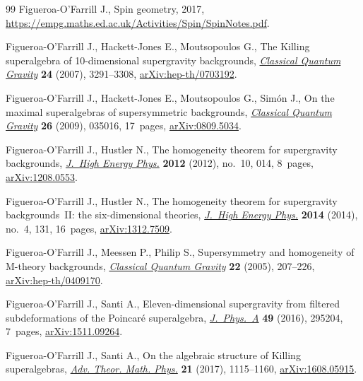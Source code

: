 \documentclass[10pt,a4paper]{amsart}
\numberwithin{equation}{section}
\newcommand{\1}{\mathbbm{1}}
\begin{document}
\begin{thebibliography}{99}
Figueroa-O'Farrill J., Spin geometry, 2017,  \url{https://empg.maths.ed.ac.uk/Activities/Spin/SpinNotes.pdf}.

Figueroa-O'Farrill J., Hackett-Jones E., Moutsopoulos G., The {K}illing
 superalgebra of 10-dimensional supergravity backgrounds,
 \href{https://doi.org/10.1088/0264-9381/24/13/010}{\textit{Classical Quantum
 Gravity}} \textbf{24} (2007), 3291--3308,
 \href{http://arxiv.org/abs/hep-th/0703192}{arXiv:hep-th/0703192}.

Figueroa-O'Farrill J., Hackett-Jones E., Moutsopoulos G., Sim\'on J., On the
 maximal superalgebras of supersymmetric backgrounds,
 \href{https://doi.org/10.1088/0264-9381/26/3/035016}{\textit{Classical
 Quantum Gravity}} \textbf{26} (2009), 035016, 17~pages,
 \href{http://arxiv.org/abs/0809.5034}{arXiv:0809.5034}.

Figueroa-O'Farrill J., Hustler N., The homogeneity theorem for supergravity
 backgrounds, \href{https://doi.org/10.1007/jhep10(2012)014}{\textit{J.~High
 Energy Phys.}} \textbf{2012} (2012), no.~10, 014, 8~pages,
 \href{http://arxiv.org/abs/1208.0553}{arXiv:1208.0553}.

Figueroa-O'Farrill J., Hustler N., The homogeneity theorem for supergravity
 backgrounds~{II}: the six-dimensional theories,
 \href{https://doi.org/10.1007/JHEP04(2014)131}{\textit{J.~High Energy Phys.}}
 \textbf{2014} (2014), no.~4, 131, 16~pages,
 \href{http://arxiv.org/abs/1312.7509}{arXiv:1312.7509}.

Figueroa-O'Farrill J., Meessen P., Philip S., Supersymmetry and homogeneity of
 {M}-theory backgrounds,
 \href{https://doi.org/10.1088/0264-9381/22/1/014}{\textit{Classical Quantum
 Gravity}} \textbf{22} (2005), 207--226,
 \href{http://arxiv.org/abs/hep-th/0409170}{arXiv:hep-th/0409170}.

Figueroa-O'Farrill J., Santi A., Eleven-dimensional supergravity from filtered
 subdeformations of the {P}oincar\'e superalgebra,
 \href{https://doi.org/10.1088/1751-8113/49/29/295204}{\textit{J.~Phys.~A}}
 \textbf{49} (2016), 295204, 7~pages,
 \href{http://arxiv.org/abs/1511.09264}{arXiv:1511.09264}.

Figueroa-O'Farrill J., Santi A., On the algebraic structure of {K}illing
 superalgebras,
 \href{https://doi.org/10.4310/ATMP.2017.v21.n5.a1}{\textit{Adv. Theor. Math.
 Phys.}} \textbf{21} (2017), 1115--1160,
 \href{http://arxiv.org/abs/1608.05915}{arXiv:1608.05915}.


\end{thebibliography}
\end{document}
